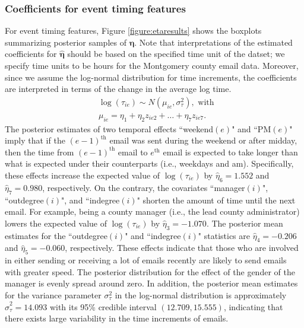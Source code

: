 \documentclass[ba]{imsart}
\numberwithin{equation}{section}
\theoremstyle{plain}
\begin{document}
	\subsubsection{Coefficients for event timing features}
	For event timing features, Figure \ref{figure:etaresults} shows the boxplots summarizing posterior samples of $\boldsymbol{\eta}$. Note that interpretations of the estimated coefficients for $\hat{\boldsymbol{\eta}}$ should be based on the specified time unit of the datset; we specify time units to be hours for the Montgomery county email data. Moreover, since we assume the log-normal distribution for time increments, the coefficients are interpreted in terms of the change in the average log time.
	\begin{equation*}
		\begin{aligned}
			&\log(\tau_{ie}) \sim N(\mu_{ie}, \sigma_\tau^2), \mbox{ with }\\
			&\mu_{ie} = \eta_{1}+\eta_{2} z_{ie2}+\ldots+\eta_{7}z_{ie7}.
		\end{aligned}
	\end{equation*}
	The posterior estimates of two temporal effects ``weekend$(e)$" and ``PM$(e)$" imply that if the $(e-1)^{\textrm{th}}$ email was sent during the weekend or after midday, then the time from $(e-1)^{\textrm{th}}$ email to $e^{\textrm{th}}$ email is expected to take longer than what is expected under their counterparts (i.e., weekdays and am). Specifically, these effects increase the expected value of $\log(\tau_{ie})$ by $\hat{\eta}_6 =1.552$ and $\hat{\eta}_7= 0.980$, respectively. On the contrary, the covariates ``manager$(i)$", ``outdegree$(i)$", and ``indegree$(i)$"  shorten the amount of time until the next email. For example, being a county manager (i.e., the lead county administrator) lowers the expected value of $\log(\tau_{ie})$ by $\hat{\eta}_3 = -1.070$. The posterior mean estimates for the  ``outdegree$(i)$" and ``indegree$(i)$" statistics are $\hat{\eta}_4=-0.206$ and $\hat{\eta}_5=-0.060$, respectively. These effects indicate that those who are involved in either sending or receiving a lot of emails recently are likely to send emails with greater speed. The posterior distribution for the effect of the gender of the manager is evenly spread around zero. In addition, the posterior mean estimates for the variance parameter $\sigma^2_\tau$ in the log-normal distribution is approximately $\hat{\sigma}^2_\tau=14.093$ with its 95\% credible interval $(12.709, 15.555)$, indicating that there exists large variability in the time increments of emails.
\end{document}
